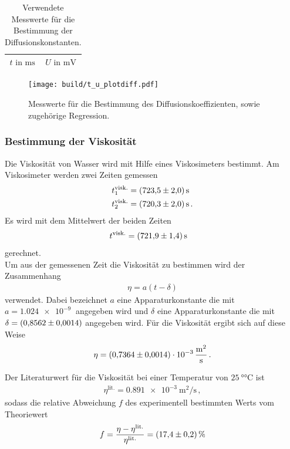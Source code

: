 \begin{table}
  \centering
  \caption{Verwendete Messwerte für die Bestimmung der Diffusionskonstanten.}
  \label{tab:diffusion}
  \begin{tabular}{c c}
  \toprule
  $t \text{ in } \si{\milli\second}$ & $U \text{ in } \si{\milli\volt}$\\
  \midrule
  
  \bottomrule
  \end{tabular}
\end{table}


\begin{figure}[hhh]
  \centering
  \texttt{[image: build/t\_u\_plotdiff.pdf]}
  \caption{Messwerte für die Bestimmung des Diffusionskoeffizienten, sowie zugehörige Regression.}
  \label{fig:diffusion}
\end{figure}

\FloatBarrier
\subsubsection{Bestimmung der Viskosität}
\label{subsubsec:viskositaet}
Die Viskosität von Wasser wird mit Hilfe eines Viskosimeters bestimmt.
Am Viskosimeter werden zwei Zeiten gemessen
\begin{align*}
  t_{1}^\text{visk.} &= \SI{723.5+-2}{\second}\\
  t_{2}^\text{visk.} &= \SI{720.3+-2}{\second}\, .
\end{align*}
Es wird mit dem Mittelwert der beiden Zeiten
\begin{align*}
  t^\text{visk.} &= \SI{721.9+-1.4}{\second}
\end{align*}
gerechnet.\\
Um aus der gemessenen Zeit die Viskosität zu bestimmen wird der Zusammenhang
\begin{align}
  \eta = a \left(t - \delta \right)
\end{align}
verwendet. Dabei bezeichnet $a$ eine Apparaturkonstante die mit $a = \SI{1.024e-9}{}$ angegeben wird und $\delta$
eine Apparaturkonstante die mit $\delta = \SI{0.8562+-0.0014}{}$ angegeben wird.
Für die Viskosität ergibt sich auf diese Weise
\begin{align*}
  \eta = \SI{0.7364+-0.0014 e-3}{\meter\squared\per\second} \, .
\end{align*}

Der Literaturwert\cite{litvisk} für die Viskosität bei einer Temperatur von $\SI{25}{\degree\celsius}$ ist
\begin{align*}
  \eta^\text{lit.} = \SI{0.891e-3}{\meter\squared\per\second} \, ,
\end{align*}
sodass die relative Abweichung $f$ des experimentell bestimmten Werts
vom Theoriewert
\begin{align*}
  f = \frac{\eta - \eta^\text{lit.}}{\eta^\text{lit.}} = \SI{17.4+-0.2}{\percent}
\end{align*}



